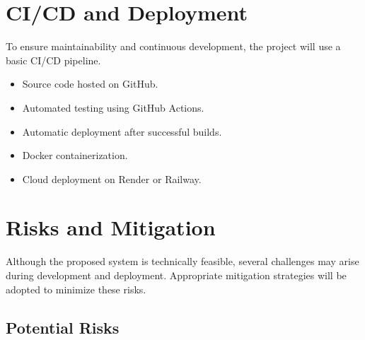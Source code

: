 \documentclass[11pt]{article}
\begin{document}
\section{CI/CD and Deployment}

To ensure maintainability and continuous development, the project will use a basic CI/CD pipeline.

\begin{itemize}

\item Source code hosted on GitHub.

\item Automated testing using GitHub Actions.

\item Automatic deployment after successful builds.

\item Docker containerization.

\item Cloud deployment on Render or Railway.

\end{itemize}
\section{Risks and Mitigation}

Although the proposed system is technically feasible, several challenges may arise during development and deployment. Appropriate mitigation strategies will be adopted to minimize these risks.

\subsection{Potential Risks}
\end{document}
